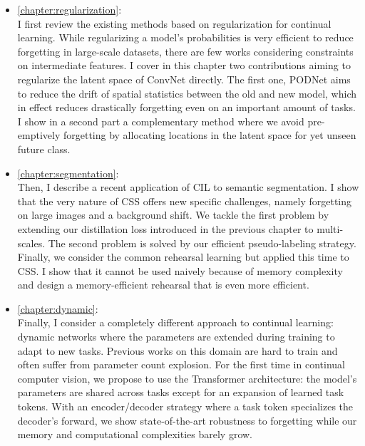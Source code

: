 \begin{itemize}
      \item \autoref{chapter:regularization}: \\
            I first review the existing methods based on regularization for continual learning. While
            regularizing a model's probabilities is very efficient to reduce forgetting in large-scale
            datasets, there are few works considering constraints on intermediate features. I cover in this
            chapter two contributions aiming to regularize the latent space of \acs{ConvNet} directly. The
            first one, \acf{PODNet} aims to reduce the drift of spatial statistics between the old and new
            model, which in effect reduces drastically forgetting even on an important amount of tasks. I show in a
            second part a complementary method where we avoid pre-emptively forgetting by allocating
            locations in the latent space for yet unseen future class.
      \item \autoref{chapter:segmentation}: \\
            Then, I describe a recent application of \acf{CIL} to semantic segmentation. I show that
            the very nature of \acf{CSS} offers new specific challenges, namely forgetting on large
            images and a background shift. We tackle the first problem by extending our distillation
            loss introduced in the previous chapter to multi-scales. The second problem is solved by
            our efficient pseudo-labeling strategy. Finally, we consider the common rehearsal learning
            but applied this time to \ac{CSS}. I show that it cannot be used naively because of memory
            complexity and design a memory-efficient rehearsal that is even more efficient.
      \item \autoref{chapter:dynamic}: \\
            Finally, I consider a completely different approach to continual learning: dynamic networks
            where the parameters are extended during training to adapt to new tasks. Previous works on
            this domain are hard to train and often suffer from parameter count explosion. For the
            first time in continual computer vision, we propose to use the Transformer architecture:
            the model's parameters are shared across tasks except for an
            expansion of learned task tokens. With an encoder/decoder strategy where a task token
            specializes the decoder's forward, we show state-of-the-art robustness to forgetting
            while our memory and computational complexities barely grow.
\end{itemize}


